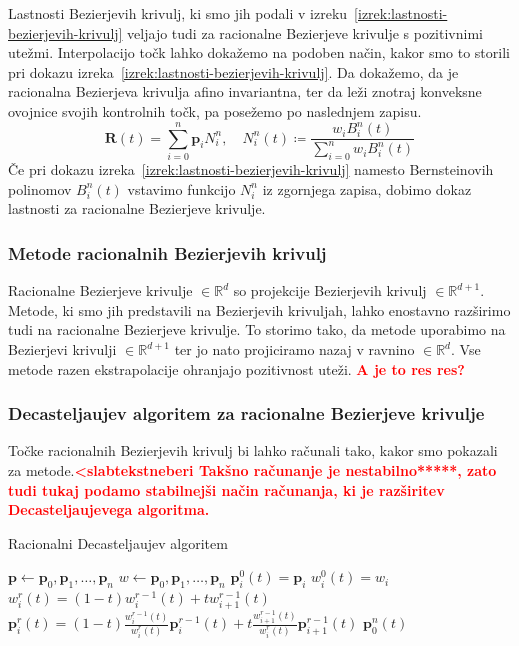 \documentclass[isrm2, tisk]{fmfdelo}
\newcommand{\R}{\mathbb R}
\newcommand{\p}{\mathbf{p}}
\newcommand{\mycomment}[1]{\textbf{\textcolor{red}{#1}}}
\begin{document}
    Lastnosti Bezierjevih krivulj, ki smo jih podali v izreku~\ref{izrek:lastnosti-bezierjevih-krivulj} veljajo tudi za racionalne Bezierjeve krivulje s pozitivnimi utežmi.
    Interpolacijo točk lahko dokažemo na podoben način, kakor smo to storili pri dokazu izreka~\ref{izrek:lastnosti-bezierjevih-krivulj}.
    Da dokažemo, da je racionalna Bezierjeva krivulja afino invariantna, ter da leži znotraj konveksne ovojnice svojih kontrolnih točk, pa posežemo po naslednjem zapisu.
    \[\mathbf{R}(t)=\sum^n_{i=0}\p_i N^n_i, \quad N^n_i(t)\coloneqq \frac{w_i B^n_i(t)}{\sum^n_{i=0}w_i B^n_i(t)}\]
    Če pri dokazu izreka~\ref{izrek:lastnosti-bezierjevih-krivulj} namesto Bernsteinovih polinomov $B_i^n(t)$ vstavimo funkcijo $N^n_i$ iz zgornjega zapisa, dobimo dokaz lastnosti za racionalne Bezierjeve krivulje.

    \subsubsection{Metode racionalnih Bezierjevih krivulj}
    Racionalne Bezierjeve krivulje $\in\R^d$ so projekcije Bezierjevih krivulj $\in\R^{d+1}$.
    Metode, ki smo jih predstavili na Bezierjevih krivuljah, lahko enostavno razširimo tudi na racionalne Bezierjeve krivulje.
    To storimo tako, da metode uporabimo na Bezierjevi krivulji $\in\R^{d+1}$ ter jo nato projiciramo nazaj v ravnino $\in\R^{d}$.
    Vse metode razen ekstrapolacije ohranjajo pozitivnost uteži. \mycomment{A je to res res?}

    \subsubsection{Decasteljaujev algoritem za racionalne Bezierjeve krivulje}
    Točke racionalnih Bezierjevih krivulj bi lahko računali tako, kakor smo pokazali za metode.\mycomment{<slabtekstneberi
    Takšno računanje je nestabilno*****, zato tudi tukaj podamo stabilnejši način računanja, ki je razširitev Decasteljaujevega algoritma.}
    \begin{algorithm}[h!]
        \caption{Racionalni Decasteljaujev algoritem}
        \begin{algorithmic}
            \State $\p \gets \p_0,\p_1,\dots,\p_n$
            \State $w\gets \p_0,\p_1,\dots,\p_n$
                \State $\p_i^0(t)=\p_i$
                \State $w_i^0(t)=w_i$
            \EndFor
                    \State $w_i^r(t)=(1-t)w_{i}^{r-1}(t)+tw_{i+1}^{r-1}(t)$
                    \State $\p_i^r(t)=(1-t)\frac{w_{i}^{r-1}(t)}{w_{i}^{r}(t)}\p_i^{r-1}(t)+t\frac{w_{i+1}^{r-1}(t)}{w_{i}^{r}(t)}\p_{i+1}^{r-1}(t)$
                \EndFor
            \EndFor
            \State \Return $\p_0^n(t)$
        \end{algorithmic}\label{alg:racionalni-decasteljau}
    \end{algorithm}
\end{document}
